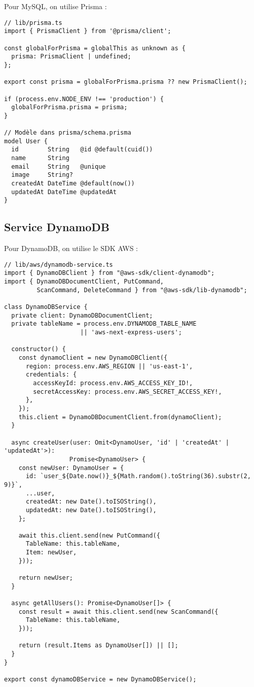 \documentclass[12pt,a4paper]{report}
\begin{document}
Pour MySQL, on utilise Prisma :

\begin{lstlisting}[caption=Configuration Prisma pour RDS MySQL]
// lib/prisma.ts
import { PrismaClient } from '@prisma/client';

const globalForPrisma = globalThis as unknown as {
  prisma: PrismaClient | undefined;
};

export const prisma = globalForPrisma.prisma ?? new PrismaClient();

if (process.env.NODE_ENV !== 'production') {
  globalForPrisma.prisma = prisma;
}

// Modèle dans prisma/schema.prisma
model User {
  id        String   @id @default(cuid())
  name      String
  email     String   @unique
  image     String?
  createdAt DateTime @default(now())
  updatedAt DateTime @updatedAt
}
\end{lstlisting}

\subsection{Service DynamoDB}

Pour DynamoDB, on utilise le SDK AWS :

\begin{lstlisting}[caption=Service DynamoDB avec AWS SDK v3]
// lib/aws/dynamodb-service.ts
import { DynamoDBClient } from "@aws-sdk/client-dynamodb";
import { DynamoDBDocumentClient, PutCommand, 
         ScanCommand, DeleteCommand } from "@aws-sdk/lib-dynamodb";

class DynamoDBService {
  private client: DynamoDBDocumentClient;
  private tableName = process.env.DYNAMODB_TABLE_NAME 
                     || 'aws-next-express-users';

  constructor() {
    const dynamoClient = new DynamoDBClient({
      region: process.env.AWS_REGION || 'us-east-1',
      credentials: {
        accessKeyId: process.env.AWS_ACCESS_KEY_ID!,
        secretAccessKey: process.env.AWS_SECRET_ACCESS_KEY!,
      },
    });
    this.client = DynamoDBDocumentClient.from(dynamoClient);
  }

  async createUser(user: Omit<DynamoUser, 'id' | 'createdAt' | 'updatedAt'>): 
                  Promise<DynamoUser> {
    const newUser: DynamoUser = {
      id: `user_${Date.now()}_${Math.random().toString(36).substr(2, 9)}`,
      ...user,
      createdAt: new Date().toISOString(),
      updatedAt: new Date().toISOString(),
    };

    await this.client.send(new PutCommand({
      TableName: this.tableName,
      Item: newUser,
    }));

    return newUser;
  }

  async getAllUsers(): Promise<DynamoUser[]> {
    const result = await this.client.send(new ScanCommand({
      TableName: this.tableName,
    }));

    return (result.Items as DynamoUser[]) || [];
  }
}

export const dynamoDBService = new DynamoDBService();
\end{lstlisting}
\end{document}
